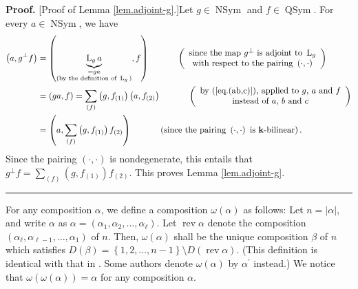 \documentclass
[numbers=enddot,12pt,final,onecolumn,notitlepage,abstracton]{scrartcl}%
\theoremstyle{definition}
\newenvironment{proof}[1][Proof]{\noindent\textbf{#1.} }{\ \rule{0.5em}{0.5em}}
\newenvironment{verlong}{}{}
\let\sumnonlimits\sum
\renewcommand{\sum}{\sumnonlimits\limits}
\begin{document}
\begin{verlong}
\begin{proof}
[Proof of Lemma \ref{lem.adjoint-g}.]Let $g\in\operatorname*{NSym}$ and
$f\in\operatorname*{QSym}$. For every $a\in\operatorname*{NSym}$, we have%
\begin{align*}
\left(  a,g^{\perp}f\right)   &  =\left(  \underbrace{\operatorname*{L}%
\nolimits_{g}a}_{\substack{=ga\\\text{(by the definition of }\operatorname*{L}%
\nolimits_{g}\text{)}}},f\right)  \ \ \ \ \ \ \ \ \ \ \left(
\begin{array}
[c]{c}%
\text{since the map }g^{\perp}\text{ is adjoint to }\operatorname*{L}%
\nolimits_{g}\\
\text{with respect to the pairing }\left(  \cdot,\cdot\right)
\end{array}
\right) \\
&  =\left(  ga,f\right)  =\sum_{\left(  f\right)  }\left(  g,f_{\left(
1\right)  }\right)  \left(  a,f_{\left(  2\right)  }\right)
\ \ \ \ \ \ \ \ \ \ \left(
\begin{array}
[c]{c}%
\text{by (\ref{eq.(ab,c)}), applied to }g\text{, }a\text{ and }f\\
\text{instead of }a\text{, }b\text{ and }c
\end{array}
\right) \\
&  =\left(  a,\sum_{\left(  f\right)  }\left(  g,f_{\left(  1\right)
}\right)  f_{\left(  2\right)  }\right)  \ \ \ \ \ \ \ \ \ \ \left(
\text{since the pairing }\left(  \cdot,\cdot\right)  \text{ is }%
\mathbf{k}\text{-bilinear}\right)  .
\end{align*}
Since the pairing $\left(  \cdot,\cdot\right)  $ is nondegenerate, this
entails that $g^{\perp}f=\sum_{\left(  f\right)  }\left(  g,f_{\left(
1\right)  }\right)  f_{\left(  2\right)  }$. This proves Lemma
\ref{lem.adjoint-g}.
\end{proof}
\end{verlong}

For any composition $\alpha$, we define a composition $\omega\left(
\alpha\right)  $ as follows: Let $n=\left\vert \alpha\right\vert $, and write
$\alpha$ as $\alpha=\left(  \alpha_{1},\alpha_{2},\ldots,\alpha_{\ell}\right)
$. Let $\operatorname*{rev}\alpha$ denote the composition $\left(
\alpha_{\ell},\alpha_{\ell-1},\ldots,\alpha_{1}\right)  $ of $n$. Then,
$\omega\left(  \alpha\right)  $ shall be the unique composition $\beta$ of $n$
which satisfies $D\left(  \beta\right)  =\left\{  1,2,\ldots,n-1\right\}
\setminus D\left(  \operatorname*{rev}\alpha\right)  $. (This definition is
identical with that in \cite[Definition 5.2.14]{Reiner}. Some authors denote
$\omega\left(  \alpha\right)  $ by $\alpha^{\prime}$ instead.) We notice that
$\omega\left(  \omega\left(  \alpha\right)  \right)  =\alpha$ for any
composition $\alpha$.
\end{document}
